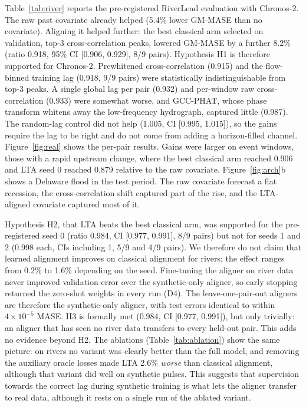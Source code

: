 \documentclass[preprint,11pt,authoryear]{elsarticle}
\newcommand{\lta}{\textsc{LTA}}
\begin{document}
Table~\ref{tab:river} reports the pre-registered RiverLead evaluation with Chronos-2. The raw past covariate already helped (5.4\% lower GM-MASE than no covariate). Aligning it helped further: the best classical arm selected on validation, top-3 cross-correlation peaks, lowered GM-MASE by a further 8.2\% (ratio 0.918, 95\% CI [0.906, 0.929], 8/9 pairs). Hypothesis H1 is therefore supported for Chronos-2. Prewhitened cross-correlation (0.915) and the flow-binned training lag (0.918, 9/9 pairs) were statistically indistinguishable from top-3 peaks. A single global lag per pair (0.932) and per-window raw cross-correlation (0.933) were somewhat worse, and GCC-PHAT, whose phase transform whitens away the low-frequency hydrograph, captured little (0.987). The random-lag control did not help (1.005, CI [0.995, 1.015]), so the gains require the lag to be right and do not come from adding a horizon-filled channel. Figure~\ref{fig:real} shows the per-pair results. Gains were larger on event windows, those with a rapid upstream change, where the best classical arm reached 0.906 and \lta{} seed 0 reached 0.879 relative to the raw covariate. Figure~\ref{fig:arch}b shows a Delaware flood in the test period. The raw covariate forecast a flat recession, the cross-correlation shift captured part of the rise, and the \lta{}-aligned covariate captured most of it.

Hypothesis H2, that \lta{} beats the best classical arm, was supported for the pre-registered seed 0 (ratio 0.984, CI [0.977, 0.991], 8/9 pairs) but not for seeds 1 and 2 (0.998 each, CIs including 1, 5/9 and 4/9 pairs). We therefore do not claim that learned alignment improves on classical alignment for rivers; the effect ranges from 0.2\% to 1.6\% depending on the seed. Fine-tuning the aligner on river data never improved validation error over the synthetic-only aligner, so early stopping returned the zero-shot weights in every run (D4). The leave-one-pair-out aligners are therefore the synthetic-only aligner, with test errors identical to within $4\times10^{-5}$ MASE. H3 is formally met (0.984, CI [0.977, 0.991]), but only trivially: an aligner that has seen no river data transfers to every held-out pair. This adds no evidence beyond H2. The ablations (Table~\ref{tab:ablation}) show the same picture: on rivers no variant was clearly better than the full model, and removing the auxiliary oracle losses made \lta{} 2.6\% \emph{worse} than classical alignment, although that variant did well on synthetic pulses. This suggests that supervision towards the correct lag during synthetic training is what lets the aligner transfer to real data, although it rests on a single run of the ablated variant.
\end{document}

